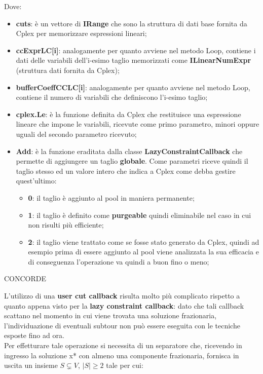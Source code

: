 \documentclass[11pt]{article}
\begin{document}
Dove:

\begin{itemize}
    \item \textbf{cuts}: è un vettore di \textbf{IRange} che sono la struttura di dati base fornita da Cplex per memorizzare espressioni lineari;
    \item \textbf{ccExprLC[i]}: analogamente per quanto avviene nel metodo Loop, contiene i dati delle variabili dell'i-esimo taglio memorizzati come \textbf{ILinearNumExpr} (struttura dati fornita da Cplex);
    \item \textbf{bufferCoeffCCLC[i]}: analogamente per quanto avviene nel metodo Loop, contiene il numero di variabili che definiscono l'i-esimo taglio;
    \item \textbf{cplex.Le}: è la funzione definita da Cplex che restituisce una espressione lineare che impone le variabili, ricevute come primo parametro, minori oppure uguali del secondo parametro ricevuto;
    \item \textbf{Add}: è la funzione eraditata dalla classe \textbf{LazyConstraintCallback} che permette di aggiungere un taglio \textbf{globale}. Come parametri riceve quindi il taglio stesso ed un valore intero che indica a Cplex come debba gestire quest'ultimo:
    \begin{itemize}
        \item \textbf{0}: il taglio è aggiunto al pool in maniera permanente;
        \item \textbf{1}: il taglio è definito come \textbf{purgeable} quindi eliminabile nel caso in cui non risulti più efficiente;
        \item \textbf{2}: il taglio viene trattato come se fosse stato generato da Cplex, quindi ad esempio prima di essere aggiunto al pool viene analizzata la sua efficacia e di conseguenza l'operazione va quindi a buon fino o meno;
    \end{itemize}

\end{itemize}


\vspace{2\baselineskip}
CONCORDE
\vspace{2\baselineskip}

L'utilizzo di una \textbf{user cut callback} risulta molto più complicato rispetto a quanto appena visto per la \textbf{lazy constraint callback}: dato che tali callback scattano nel momento in cui viene trovata una soluzione frazionaria, l'individuazione di eventuali subtour non può essere eseguita con le tecniche esposte fino ad ora.\\
Per effetturare tale operazione si necessita di un separatore che, ricevendo in ingresso la soluzione x* con almeno una componente frazionaria, fornisca in uscita un insieme $S\subsetneq{V}$, $|S|\geq{2}$ tale per cui:
\end{document}
